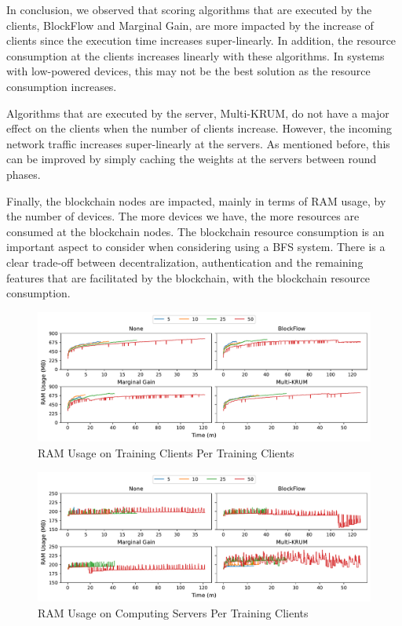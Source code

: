 In conclusion, we observed that scoring algorithms that are executed by the clients, BlockFlow and Marginal Gain, are more impacted by the increase of clients since the execution time increases super-linearly. In addition, the resource consumption at the clients increases linearly with these algorithms. In systems with low-powered devices, this may not be the best solution as the resource consumption increases.

Algorithms that are executed by the server, Multi-KRUM, do not have a major effect on the clients when the number of clients increase. However, the incoming network traffic increases super-linearly at the servers. As mentioned before, this can be improved by simply caching the weights at the servers between round phases.

Finally, the blockchain nodes are impacted, mainly in terms of RAM usage, by the number of devices. The more devices we have, the more resources are consumed at the blockchain nodes. The blockchain resource consumption is an important aspect to consider when considering using a BFS system. There is a clear trade-off between decentralization, authentication and the remaining features that are facilitated by the blockchain, with the blockchain resource consumption.

\clearpage

\begin{figure}[!h]
    \centering
    \includegraphics[width=\textwidth]{graphics/clients/ram_client.pdf}
    \caption{RAM Usage on Training Clients Per Training Clients}
    \label{fig:ram_clients_clients}
\end{figure}

\vfill

\begin{figure}[!h]
    \centering
    \includegraphics[width=\textwidth]{graphics/clients/ram_server.pdf}
    \caption{RAM Usage on Computing Servers Per Training Clients}
    \label{fig:ram_clients_servers}
\end{figure}


